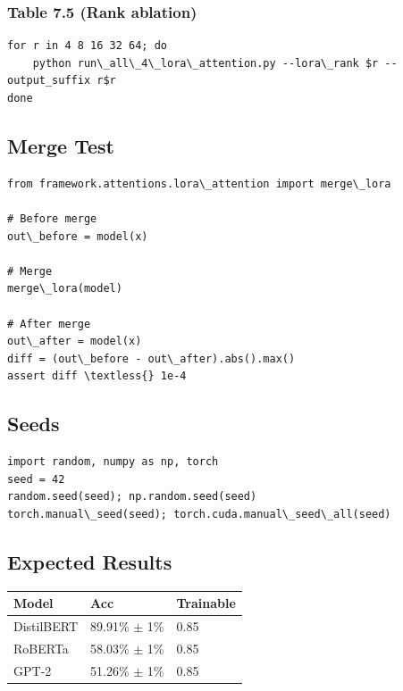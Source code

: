 \subsubsection{Table 7.5 (Rank ablation)}
\begin{lstlisting}
for r in 4 8 16 32 64; do
    python run\_all\_4\_lora\_attention.py --lora\_rank $r --output_suffix r$r
done
\end{lstlisting}

\subsection{Merge Test}

\begin{lstlisting}
from framework.attentions.lora\_attention import merge\_lora

# Before merge
out\_before = model(x)

# Merge
merge\_lora(model)

# After merge
out\_after = model(x)
diff = (out\_before - out\_after).abs().max()
assert diff \textless{} 1e-4
\end{lstlisting}

\subsection{Seeds}

\begin{lstlisting}
import random, numpy as np, torch
seed = 42
random.seed(seed); np.random.seed(seed)
torch.manual\_seed(seed); torch.cuda.manual\_seed\_all(seed)
\end{lstlisting}

\subsection{Expected Results}

\begin{table}[H]
\centering
\small
\begin{tabular}{lll}
\toprule
\textbf{Model} & \textbf{Acc} & \textbf{Trainable} \\
\midrule
DistilBERT & 89.91\% $\pm$ 1\% & 0.85 \\
RoBERTa & 58.03\% $\pm$ 1\% & 0.85 \\
GPT-2 & 51.26\% $\pm$ 1\% & 0.85 \\
\bottomrule
\end{tabular}
\end{table}

